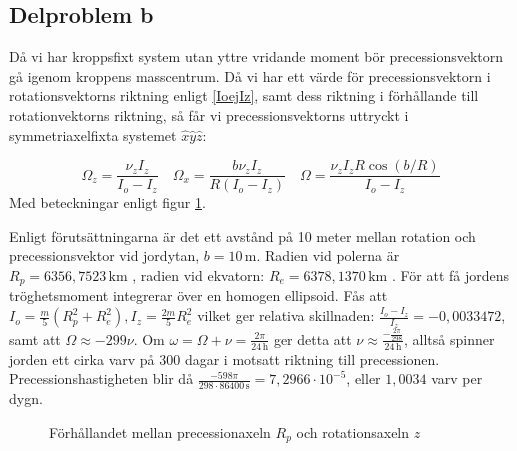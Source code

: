 \documentclass[12pt,a4paper]{article}
\begin{document}
	\subsection{Delproblem b}
	Då vi har kroppsfixt system utan yttre vridande moment bör precessionsvektorn
	gå igenom kroppens masscentrum.  Då vi har ett värde för precessionsvektorn i 
        rotationsvektorns riktning enligt \eqref{IoejIz}, samt dess riktning i förhållande 
        till rotationvektorns riktning, så får vi precessionsvektorns uttryckt i 
        symmetriaxelfixta systemet $\hat{x}\hat{y}\hat{z}$:
	
	\begin{equation*}
		\Omega_z = \frac{\nu_z I_z}{I_o-I_z}
		\hspace{12pt}
		\Omega_x = \frac{b \nu_z I_z}{R(I_o-I_z)}
		\hspace{12pt}
		\Omega = \frac{\nu_z I_z R \cos(b/R)}{I_o-I_z}
	\end{equation*}
	Med beteckningar enligt figur \ref{jorden}.

	Enligt förutsättningarna är det ett avstånd på 10 meter mellan rotation och
	precessionsvektor vid jordytan, $b=10 \,\mathrm{m}$. Radien vid polerna är $R_p= 6356,7523 \,\mathrm{km}$ \footnotemark[1],
	radien vid ekvatorn: $R_e=6378,1370 \,\mathrm{km}$ \footnotemark[1]. För att få jordens tröghetsmoment integrerar över en homogen ellipsoid.
	Fås att $I_o = \frac{m}{5}(R_p^2+R_e^2), I_z = \frac{2m}{5}R_e^2$ vilket ger relativa
	skillnaden: $\frac{I_o-I_z}{I_z} = -0,0033472$, samt att $\Omega \approx -299\nu$. Om
	$\omega=\Omega+\nu = \frac{2\pi}{24 \,\mathrm{h}}$ ger detta att
	$\nu \approx \frac{-\frac{2\pi}{298}}{24 \,\mathrm{h}}$, alltså spinner jorden ett cirka varv på 300
	dagar i motsatt riktning till precessionen. Precessionshastigheten blir då $\frac{-598\pi}{298 \cdot 86400 \,\mathrm{s}} = 7,2966 \cdot 10^{-5}$, eller $1,0034$ varv per dygn.

	\begin{figure}
		\begin{center}
			
			\caption{Förhållandet mellan precessionaxeln $R_p$ och rotationsaxeln $z$}
                        \label{jorden}
		\end{center}
	\end{figure}
\end{document}

